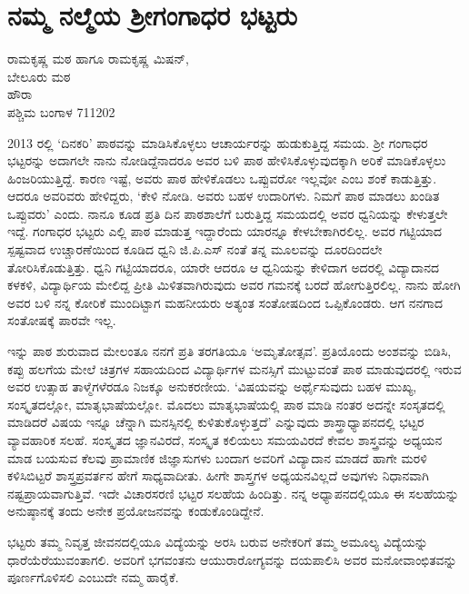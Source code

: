 {\fontsize{14}{16}\selectfont
\chapter{ನಮ್ಮ ನಲ್ಮೆಯ ಶ್ರೀಗಂಗಾಧರ ಭಟ್ಟರು}

\begin{center}
\smallskip

ರಾಮಕೃಷ್ಣ ಮಠ ಹಾಗೂ ರಾಮಕೃಷ್ಣ ಮಿಷನ್,\\
ಬೇಲೂರು ಮಠ \\
ಹೌರಾ \\ 
ಪಶ್ಚಿಮ ಬಂಗಾಳ  \enginline{-}  711202
\addrule
\end{center}

2013 ರಲ್ಲಿ ‘ದಿನಕರಿ’ ಪಾಠವನ್ನು ಮಾಡಿಸಿಕೊಳ್ಳಲು ಆಚಾರ್ಯರನ್ನು ಹುಡುಕುತ್ತಿದ್ದ ಸಮಯ. ಶ್ರೀ ಗಂಗಾಧರ ಭಟ್ಟರನ್ನು ಅದಾಗಲೇ ನಾನು ನೋಡಿದ್ದೆನಾದರೂ ಅವರ ಬಳಿ ಪಾಠ ಹೇಳಿಸಿಕೊಳ್ಳುವುದಕ್ಕಾಗಿ ಅರಿಕೆ ಮಾಡಿಕೊಳ್ಳಲು ಹಿಂಜರಿಯುತ್ತಿದ್ದೆ. ಕಾರಣ ಇಷ್ಟೆ, ಅವರು ಪಾಠ ಹೇಳಿಕೊಡಲು ಒಪ್ಪುವರೋ ಇಲ್ಲವೋ ಎಂಬ ಶಂಕೆ ಕಾಡುತ್ತಿತ್ತು. ಆದರೂ ಅವರಿವರು ಹೇಳಿದ್ದರು, `ಕೇಳಿ ನೋಡಿ. ಅವರು ಬಹಳ ಉದಾರಿಗಳು. ನಿಮಗೆ ಪಾಠ ಮಾಡಲು ಖಂಡಿತ ಒಪ್ಪುವರು' ಎಂದು. ನಾನೂ ಕೂಡ ಪ್ರತಿ ದಿನ ಪಾಠಶಾಲೆಗೆ ಬರುತ್ತಿದ್ದ ಸಮಯದಲ್ಲಿ ಅವರ ಧ್ವನಿಯನ್ನು ಕೇಳುತ್ತಲೇ ಇದ್ದೆ. ಗಂಗಾಧರ ಭಟ್ಟರು ಎಲ್ಲಿ ಪಾಠ ಮಾಡುತ್ತ ಇದ್ದಾರೆಂದು ಯಾರನ್ನೂ ಕೇಳಬೇಕಾಗಿರಲಿಲ್ಲ. ಅವರ ಗಟ್ಟಿಯಾದ ಸ್ಪಷ್ಟವಾದ ಉಚ್ಚಾರಣೆಯಿಂದ ಕೂಡಿದ ಧ್ವನಿ ಜಿ.ಪಿ.ಎಸ್ ನಂತೆ ತನ್ನ ಮೂಲವನ್ನು ದೂರದಿಂದಲೇ ತೋರಿಸಿಕೊಡುತ್ತಿತ್ತು. ಧ್ವನಿ ಗಟ್ಟಿಯಾದರೂ, ಯಾರೇ ಆದರೂ ಆ ಧ್ವನಿಯನ್ನು ಕೇಳಿದಾಗ ಅದರಲ್ಲಿ ವಿದ್ಯಾದಾನದ ಕಳಕಳಿ, ವಿದ್ಯಾರ್ಥಿಯ ಮೇಲಿದ್ದ ಪ್ರೀತಿ ಮಿಳಿತವಾಗಿರುವುದು ಅವರ  ಗಮನಕ್ಕೆ ಬರದೆ ಹೋಗುತ್ತಿರಲಿಲ್ಲ. ನಾನು ಹೋಗಿ ಅವರ ಬಳಿ ನನ್ನ ಕೋರಿಕೆ ಮುಂದಿಟ್ಟಾಗ ಮಹನೀಯರು ಅತ್ಯಂತ ಸಂತೋಷದಿಂದ ಒಪ್ಪಿಕೊಂಡರು. ಆಗ ನನಗಾದ ಸಂತೋಷಕ್ಕೆ ಪಾರವೇ ಇಲ್ಲ. 

ಇನ್ನು ಪಾಠ ಶುರುವಾದ ಮೇಲಂತೂ ನನಗೆ ಪ್ರತಿ ತರಗತಿಯೂ ‘ಅಮೃತೋತ್ಸವ’. ಪ್ರತಿಯೊಂದು ಅಂಶವನ್ನು ಬಿಡಿಸಿ, ಕಪ್ಪು ಹಲಗೆಯ ಮೇಲೆ ಚಿತ್ರಗಳ ಸಹಾಯದಿಂದ ವಿದ್ಯಾರ್ಥಿಗಳ ಮನಸ್ಸಿಗೆ ಮುಟ್ಟುವಂತೆ ಪಾಠ ಮಾಡುವುದರಲ್ಲಿ ಇರುವ ಅವರ ಉತ್ಸಾಹ ತಾಳ್ಮೆಗಳೆರಡೂ ನಿಜಕ್ಕೂ ಅನುಕರಣೀಯ.  ‘ವಿಷಯವನ್ನು ಅರ್ಥೈಸುವುದು ಬಹಳ ಮುಖ್ಯ, ಸಂಸ್ಕೃತದಲ್ಲೋ, ಮಾತೃಭಾಷೆಯಲ್ಲೋ. ಮೊದಲು ಮಾತೃಭಾಷೆಯಲ್ಲಿ ಪಾಠ ಮಾಡಿ ನಂತರ ಅದನ್ನೇ ಸಂಸೃತದಲ್ಲಿ ಮಾಡಿದರೆ ವಿಷಯ ಇನ್ನೂ ಚೆನ್ನಾಗಿ ಮನಸ್ಸಿನಲ್ಲಿ ಕುಳಿತುಕೊಳ್ಳುತ್ತದೆ’ ಎನ್ನುವುದು ಶಾಸ್ತ್ರಾಧ್ಯಾಪನದಲ್ಲಿ ಭಟ್ಟರ ವ್ಯಾವಹಾರಿಕ ಸಲಹೆ. ಸಂಸ್ಕೃತದ ಜ್ಞಾನವಿರದೆ, ಸಂಸ್ಕೃತ ಕಲಿಯಲು ಸಮಯವಿರದೆ  ಕೇವಲ ಶಾಸ್ತ್ರವನ್ನು ಅಧ್ಯಯನ ಮಾಡ ಬಯಸುವ ಕೆಲವು ಪ್ರಾಮಾಣಿಕ ಜಿಜ್ಞಾಸುಗಳು ಬಂದಾಗ ಅವರಿಗೆ ವಿದ್ಯಾದಾನ ಮಾಡದೆ ಹಾಗೇ ಮರಳಿ ಕಳಿಸಿಬಿಟ್ಟರೆ ಶಾಸ್ತ್ರಪ್ರವರ್ತನ ಹೇಗೆ ಸಾಧ್ಯವಾದೀತು. ಹೀಗೇ ಶಾಸ್ತ್ರಗಳ ಅಧ್ಯಯನವಿಲ್ಲದೆ ಅವುಗಳು ನಿಧಾನವಾಗಿ ನಷ್ಟಪ್ರಾಯವಾಗುತ್ತಿವೆ. ಇದೇ ವಿಚಾರಸರಣಿ ಭಟ್ಟರ ಸಲಹೆಯ ಹಿಂದಿತ್ತು. ನನ್ನ ಅಧ್ಯಾಪನದಲ್ಲಿಯೂ ಈ ಸಲಹೆಯನ್ನು ಅನುಷ್ಠಾನಕ್ಕೆ ತಂದು ಅನೇಕ ಪ್ರಯೋಜನವನ್ನು ಕಂಡುಕೊಂಡಿದ್ದೇನೆ. 

ಭಟ್ಟರು ತಮ್ಮ ನಿವೃತ್ತ ಜೀವನದಲ್ಲಿಯೂ ವಿದ್ಯೆಯನ್ನು ಅರಸಿ ಬರುವ ಅನೇಕರಿಗೆ ತಮ್ಮ ಅಮೂಲ್ಯ ವಿದ್ಯೆಯನ್ನು ಧಾರೆಯೆರೆಯುವಂತಾಗಲಿ. ಅವರಿಗೆ ಭಗವಂತನು ಆಯುರಾರೋಗ್ಯವನ್ನು ದಯಪಾಲಿಸಿ ಅವರ ಮನೋವಾಂಛಿತವನ್ನು ಪೂರ್ಣಗೊಳಿಸಲಿ ಎಂಬುದೇ ನಮ್ಮ ಹಾರೈಕೆ.

\articleend
}
